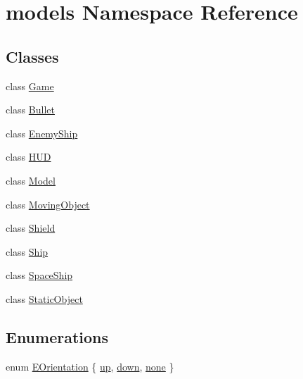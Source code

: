 \hypertarget{namespacemodels}{\section{models \-Namespace \-Reference}
\label{d7/d95/namespacemodels}
}
\subsection*{\-Classes}
\begin{DoxyCompactItemize}
\item 
class \hyperlink{classmodels_1_1Game}{\-Game}
\item 
class \hyperlink{classmodels_1_1Bullet}{\-Bullet}
\item 
class \hyperlink{classmodels_1_1EnemyShip}{\-Enemy\-Ship}
\item 
class \hyperlink{classmodels_1_1HUD}{\-H\-U\-D}
\item 
class \hyperlink{classmodels_1_1Model}{\-Model}
\item 
class \hyperlink{classmodels_1_1MovingObject}{\-Moving\-Object}
\item 
class \hyperlink{classmodels_1_1Shield}{\-Shield}
\item 
class \hyperlink{classmodels_1_1Ship}{\-Ship}
\item 
class \hyperlink{classmodels_1_1SpaceShip}{\-Space\-Ship}
\item 
class \hyperlink{classmodels_1_1StaticObject}{\-Static\-Object}
\end{DoxyCompactItemize}
\subsection*{\-Enumerations}
\begin{DoxyCompactItemize}
\item 
enum \hyperlink{namespacemodels_adec64ede5178a8b8fed882b3790d423d}{\-E\-Orientation} \{ \hyperlink{namespacemodels_adec64ede5178a8b8fed882b3790d423da00779686fef3241b4c47e6ea5f4e9725}{up}, 
\hyperlink{namespacemodels_adec64ede5178a8b8fed882b3790d423daf5fc461da1ad7e0ac10ac916e61e37b1}{down}, 
\hyperlink{namespacemodels_adec64ede5178a8b8fed882b3790d423da5506c07d2c664497722fa424805edcbf}{none}
 \}
\end{DoxyCompactItemize}


